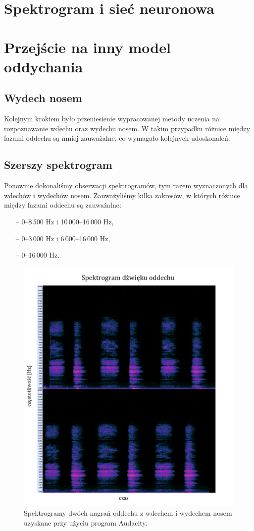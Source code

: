 \documentclass[polish]{article}
\begin{document}
\section{Spektrogram i sieć neuronowa}

\section{Przejście na inny model oddychania}
\subsection{Wydech nosem}
Kolejnym krokiem było przeniesienie wypracowanej metody uczenia na rozpoznawanie wdechu oraz wydechu nosem. W takim przypadku różnice między fazami oddechu są mniej zauważalne, co wymagało kolejnych udoskonaleń.
\subsection{Szerszy spektrogram}
Ponownie dokonaliśmy obserwacji spektrogramów, tym razem wyznaczonych dla wdechów i wydechów nosem. Zauważyliśmy kilka zakresów, w których różnice między fazami oddechu są zauważalne:
\begin{itemize}
	\setlength\itemsep{-0.25em}
	\item[--] 0--8\,500 \unit{Hz} i 10\,000--16\,000 \unit{Hz},
	\item[--] 0--3\,000 \unit{Hz} i 6\,000--16\,000 \unit{Hz},
	\item[--] 0--16\,000 \unit{Hz}.
\end{itemize}
\begin{figure}[H]
	\centering
	\includegraphics[width=13cm]{spektrogram_wydech_nosem}
	\caption{Spektrogramy dwóch nagrań oddechu z wdechem i wydechem nosem uzyskane przy użyciu program Audacity.}
\end{figure}
\end{document}
